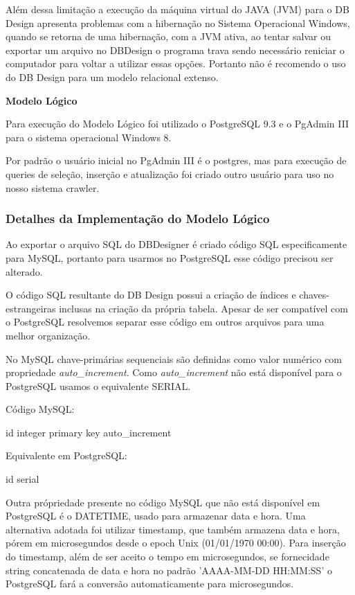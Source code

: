 \documentclass[12pt]{article}
\begin{document}
Além dessa limitação a execução da máquina virtual do JAVA (JVM) para o DB Design apresenta problemas com a hibernação no Sistema Operacional Windows, quando se retorna de uma hibernação, com a JVM ativa, ao tentar salvar ou exportar um arquivo no DBDesign o programa trava sendo necessário reniciar o computador para voltar a utilizar essas opções. Portanto não é recomendo o uso do DB Design para um modelo relacional extenso. 

\textbf{Modelo Lógico}\newline

Para execução do Modelo Lógico foi utilizado o PostgreSQL 9.3 e o PgAdmin III para o sistema operacional Windows 8. 

Por padrão o usuário inicial no PgAdmin III é o postgres, mas para execução de queries de seleção, inserção e atualização foi criado outro usuário para uso no nosso sistema crawler. 

\subsubsection{Detalhes da Implementação do Modelo Lógico}

Ao exportar o arquivo SQL do DBDesigner é criado código SQL especificamente para MySQL, portanto para usarmos no PostgreSQL esse código precisou ser alterado.

O código SQL resultante do DB Design possui a criação de índices e chaves-estrangeiras inclusas na criação da própria tabela. Apesar de ser compatível com o PostgreSQL resolvemos separar esse código em outros arquivos para uma melhor organização.

No MySQL chave-primárias sequenciais são definidas como valor numérico com propriedade \emph{auto\_increment}. Como \emph{auto\_increment} não está disponível para o PostgreSQL usamos o equivalente SERIAL.

Código MySQL:

id integer primary key auto\_increment

Equivalente em PostgreSQL:

id serial

Outra própriedade presente no código MySQL que não está disponível em PostgreSQL é o DATETIME, usado para armazenar data e hora. Uma alternativa adotada foi utilizar timestamp, que também armazena data e hora, pórem em microsegundos desde o epoch Unix (01/01/1970 00:00). Para inserção do timestamp, além de ser aceito o tempo em microsegundos, se fornecidade string concatenada de data e hora no padrão 'AAAA-MM-DD HH:MM:SS' o PostgreSQL fará a conversão automaticamente para microsegundos. 
\end{document}
